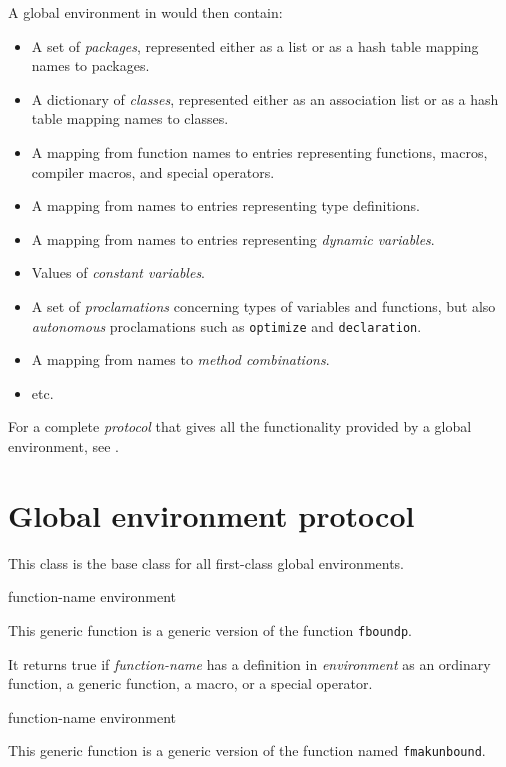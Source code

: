 A global environment in \sysname{} would then contain:

\begin{itemize}
\item A set of \emph{packages}, represented either as a list or as a
  hash table mapping names to packages.
\item A dictionary of \emph{classes}, represented either as an
  association list or as a hash table mapping names to classes.
\item A mapping from function names to entries representing functions,
  macros, compiler macros, and special operators.
\item A mapping from names to entries representing type definitions.
\item A mapping from names to entries representing \emph{dynamic variables}.
\item Values of \emph{constant variables}.
\item A set of \emph{proclamations} concerning types of variables and
  functions, but also \emph{autonomous} proclamations such as
  \texttt{optimize} and \texttt{declaration}.
\item A mapping from names to \emph{method combinations}.
\item etc.
\end{itemize}

For a complete \emph{protocol} that gives all the functionality
provided by a global environment, see
.

\section{Global environment protocol}
\label{sec-environments-global-environment-protocol}


This class is the base class for all first-class global environments.

 {function-name environment}

This generic function is a generic version of the \commonlisp{}
function \texttt{fboundp}.

It returns true if \textit{function-name} has a definition in
\textit{environment} as an ordinary function, a generic function, a
macro, or a special operator.

 {function-name environment}

This generic function is a generic version of the \commonlisp{}
function named \texttt{fmakunbound}.

